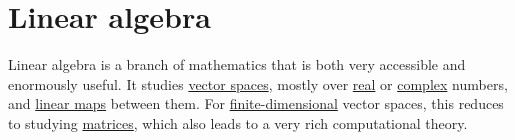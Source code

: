 \section{Linear algebra}\label{sec:linear_algebra}

Linear algebra is a branch of mathematics that is both very accessible and enormously useful. It studies \hyperref[def:vector_space]{vector spaces}, mostly over \hyperref[def:set_of_real_numbers]{real} or \hyperref[def:set_of_complex_numbers]{complex} numbers, and \hyperref[def:linear_operator]{linear maps} between them. For \hyperref[def:vector_space_dimension]{finite-dimensional} vector spaces, this reduces to studying \hyperref[def:array/matrix]{matrices}, which also leads to a very rich computational theory.
